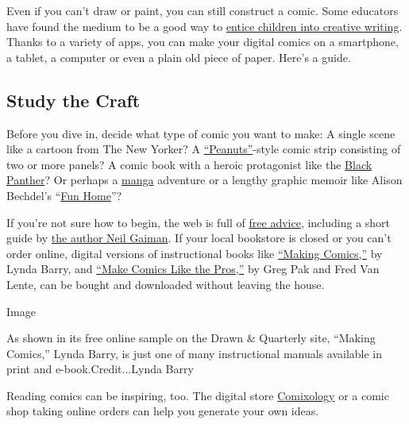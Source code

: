 Even if you can't draw or paint, you can still construct a comic. Some
educators have found the medium to be a good way to
\href{https://bookcreator.com/2015/11/how-can-we-use-comics-in-the-classroom/}{entice
children into creative writing}. Thanks to a variety of apps, you can
make your digital comics on a smartphone, a tablet, a computer or even a
plain old piece of paper. Here's a guide.

\hypertarget{study-the-craft}{%
\subsection{Study the Craft}\label{study-the-craft}}

Before you dive in, decide what type of comic you want to make: A single
scene like a cartoon from The New Yorker? A
\href{https://www.peanuts.com/}{``Peanuts''}-style comic strip
consisting of two or more panels? A comic book with a heroic protagonist
like the
\href{https://www.marvel.com/comics/discover/460/black-panther}{Black
Panther}? Or perhaps a
\href{https://www.nypl.org/blog/2018/12/27/beginners-guide-manga}{manga}
adventure or a lengthy graphic memoir like Alison Bechdel's
``\href{https://www.hmhbooks.com/shop/books/Fun-Home/9780618871711/}{Fun
Home}''?

If you're not sure how to begin, the web is full of
\href{https://www.wikihow.com/Make-a-Comic}{free advice}, including a
short guide by
\href{https://www.masterclass.com/articles/how-to-create-a-comic-book-step-by-step-guide-for-making-your-own-comics\#how-to-come-up-with-an-idea-for-a-comic-book-in-4-steps}{the
author Neil Gaiman}. If your local bookstore is closed or you can't
order online, digital versions of instructional books like
\href{https://www.amazon.com/Making-Comics-Lynda-Barry-ebook/dp/B086MD8HYT/ref=tmm_kin_swatch_0?_encoding=UTF8\&qid=\&sr=}{``Making
Comics,''} by Lynda Barry, and
\href{https://www.penguinrandomhouse.com/books/222732/make-comics-like-the-pros-by-greg-pak-and-fred-van-lente/}{``Make
Comics Like the Pros,''} by Greg Pak and Fred Van Lente, can be bought
and downloaded without leaving the house.

Image

As shown in its free online sample on the Drawn \& Quarterly site,
``Making Comics,'' Lynda Barry, is just one of many instructional
manuals available in print and e-book.Credit...Lynda Barry

Reading comics can be inspiring, too. The digital store
\href{https://www.comixology.com/}{Comixology} or a comic shop taking
online orders can help you generate your own ideas.


